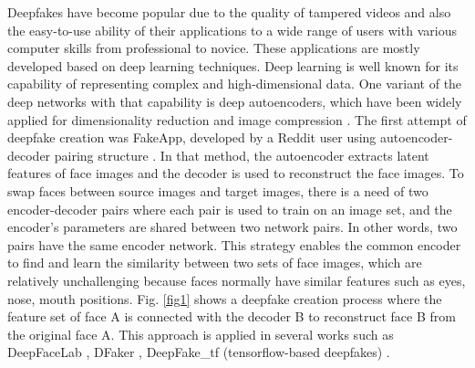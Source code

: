 \label{sec2}
Deepfakes have become popular due to the quality of tampered videos and also the easy-to-use ability of their applications to a wide range of users with various computer skills from professional to novice. These applications are mostly developed based on deep learning techniques. Deep learning is well known for its capability of representing complex and high-dimensional data. One variant of the deep networks with that capability is deep autoencoders, which have been widely applied for dimensionality reduction and image compression . The first attempt of deepfake creation was FakeApp, developed by a Reddit user using autoencoder-decoder pairing structure . In that method, the autoencoder extracts latent features of face images and the decoder is used to reconstruct the face images. To swap faces between source images and target images, there is a need of two encoder-decoder pairs where each pair is used to train on an image set, and the encoder's parameters are shared between two network pairs. In other words, two pairs have the same encoder network. This strategy enables the common encoder to find and learn the similarity between two sets of face images, which are relatively unchallenging because faces normally have similar features such as eyes, nose, mouth positions. Fig. \ref{fig1} shows a deepfake creation process where the feature set of face A is connected with the decoder B to reconstruct face B from the original face A. This approach is applied in several works such as DeepFaceLab , DFaker , DeepFake\_tf (tensorflow-based deepfakes) .
